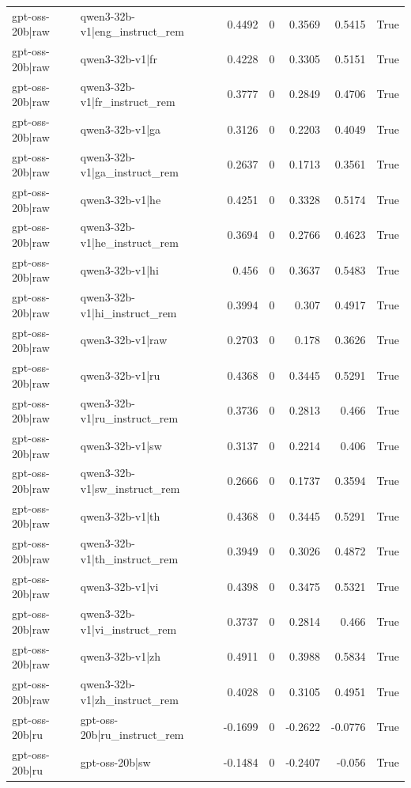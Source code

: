 \begin{table}
\begin{tabular}{l l r r r r l}
gpt-oss-20b|raw & qwen3-32b-v1|eng_instruct_rem & 0.4492 & 0 & 0.3569 & 0.5415 & True \\
gpt-oss-20b|raw & qwen3-32b-v1|fr & 0.4228 & 0 & 0.3305 & 0.5151 & True \\
gpt-oss-20b|raw & qwen3-32b-v1|fr_instruct_rem & 0.3777 & 0 & 0.2849 & 0.4706 & True \\
gpt-oss-20b|raw & qwen3-32b-v1|ga & 0.3126 & 0 & 0.2203 & 0.4049 & True \\
gpt-oss-20b|raw & qwen3-32b-v1|ga_instruct_rem & 0.2637 & 0 & 0.1713 & 0.3561 & True \\
gpt-oss-20b|raw & qwen3-32b-v1|he & 0.4251 & 0 & 0.3328 & 0.5174 & True \\
gpt-oss-20b|raw & qwen3-32b-v1|he_instruct_rem & 0.3694 & 0 & 0.2766 & 0.4623 & True \\
gpt-oss-20b|raw & qwen3-32b-v1|hi & 0.456 & 0 & 0.3637 & 0.5483 & True \\
gpt-oss-20b|raw & qwen3-32b-v1|hi_instruct_rem & 0.3994 & 0 & 0.307 & 0.4917 & True \\
gpt-oss-20b|raw & qwen3-32b-v1|raw & 0.2703 & 0 & 0.178 & 0.3626 & True \\
gpt-oss-20b|raw & qwen3-32b-v1|ru & 0.4368 & 0 & 0.3445 & 0.5291 & True \\
gpt-oss-20b|raw & qwen3-32b-v1|ru_instruct_rem & 0.3736 & 0 & 0.2813 & 0.466 & True \\
gpt-oss-20b|raw & qwen3-32b-v1|sw & 0.3137 & 0 & 0.2214 & 0.406 & True \\
gpt-oss-20b|raw & qwen3-32b-v1|sw_instruct_rem & 0.2666 & 0 & 0.1737 & 0.3594 & True \\
gpt-oss-20b|raw & qwen3-32b-v1|th & 0.4368 & 0 & 0.3445 & 0.5291 & True \\
gpt-oss-20b|raw & qwen3-32b-v1|th_instruct_rem & 0.3949 & 0 & 0.3026 & 0.4872 & True \\
gpt-oss-20b|raw & qwen3-32b-v1|vi & 0.4398 & 0 & 0.3475 & 0.5321 & True \\
gpt-oss-20b|raw & qwen3-32b-v1|vi_instruct_rem & 0.3737 & 0 & 0.2814 & 0.466 & True \\
gpt-oss-20b|raw & qwen3-32b-v1|zh & 0.4911 & 0 & 0.3988 & 0.5834 & True \\
gpt-oss-20b|raw & qwen3-32b-v1|zh_instruct_rem & 0.4028 & 0 & 0.3105 & 0.4951 & True \\
gpt-oss-20b|ru & gpt-oss-20b|ru_instruct_rem & -0.1699 & 0 & -0.2622 & -0.0776 & True \\
gpt-oss-20b|ru & gpt-oss-20b|sw & -0.1484 & 0 & -0.2407 & -0.056 & True \\

\end{tabular}
\end{table}
